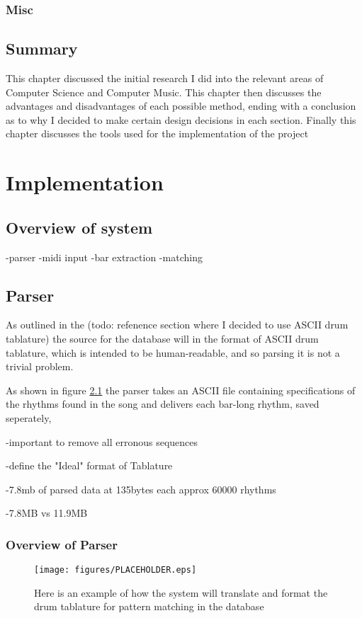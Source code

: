 \documentclass[12pt,twoside,notitlepage]{report}
\begin{document}
		\subsection{Misc}
		
	\section{Summary}
	This chapter discussed the initial research I did into the relevant areas of Computer Science and Computer Music. This chapter then discusses the advantages and disadvantages of each possible method, ending with a conclusion as to why I decided to make certain design decisions in each section. Finally this chapter discusses the tools used for the implementation of the project
\cleardoublepage
\chapter{Implementation}
	\section{Overview of system}
	
	-parser
	-midi input
	-bar extraction
	-matching
	\section{Parser}
	As outlined in the (todo: refenence section where I decided to use ASCII drum tablature) the source for the database will in the format of ASCII drum tablature, which is intended to be human-readable, and so parsing it is not a trivial problem. 
	
	As shown in figure \ref{exampleIdealParse} the parser takes an ASCII file containing specifications of the rhythms found in the song and delivers each bar-long rhythm, saved seperately, 
	
	
	-important to remove all erronous sequences

	-define the "Ideal" format of Tablature

	-7.8mb of parsed data at 135bytes each approx 60000 rhythms

	-7.8MB vs 11.9MB
	
		\subsection{Overview of Parser}
\begin{figure}[h]
			\centerline{\texttt{[image: figures/PLACEHOLDER.eps]}}
			\caption{\label{exampleIdealParse} Here is an example of how the system will translate and format the drum tablature for pattern matching in the database}
\end{figure}
\end{document}
